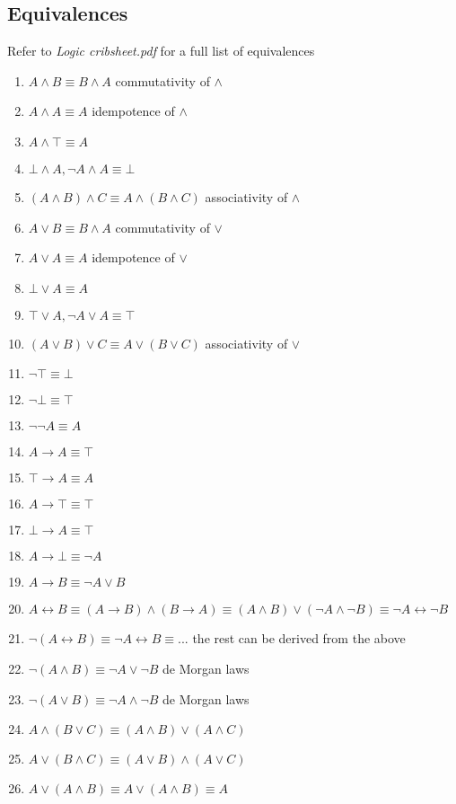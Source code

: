 \documentclass[a4paper, 12pt]{article}
\begin{document}
        \subsection*{Equivalences}
        Refer to \textit{Logic cribsheet.pdf} for a full list of equivalences
        \begin{enumerate}[1.]
            \item $A \land B \equiv B \land A$ \hfill commutativity of $\land$
            \item $A \land A \equiv A$ \hfill idempotence of $\land$
            \item $A \land \top \equiv A$
            \item $\bot \land A, \neg A \land A \equiv \bot$
            \item $(A \land B) \land C \equiv A \land (B \land C)$ \hfill associativity of $\land$
            \item $A \lor B \equiv B \land A$ \hfill commutativity of $\lor$
            \item $A \lor A \equiv A$ \hfill idempotence of $\lor$
            \item $\bot \lor A \equiv A$
            \item $\top \lor A, \neg A \lor A \equiv \top$
            \item $(A \lor B) \lor C \equiv A \lor (B \lor C)$ \hfill associativity of $\lor$
            \item $\neg \top \equiv \bot$
            \item $\neg \bot \equiv \top$
            \item $\neg \neg A \equiv A$
            \item $A \rightarrow A \equiv \top$
            \item $\top \rightarrow A \equiv A$
            \item $A \rightarrow \top \equiv \top$
            \item $\bot \rightarrow A \equiv \top$
            \item $A \rightarrow \bot \equiv \neg A$
            \item $A \rightarrow B \equiv \neg A \lor B$
            \item $A \leftrightarrow B \equiv (A \rightarrow B) \land (B \rightarrow A) \equiv (A \land B) \lor (\neg A \land \neg B) \equiv \neg A \leftrightarrow \neg B$
            \item $\neg (A \leftrightarrow B) \equiv \neg A \leftrightarrow B \equiv ...$ \hfill the rest can be derived from the above
            \item $\neg (A \land B) \equiv \neg A \lor \neg B$ \hfill de Morgan laws
            \item $\neg (A \lor B) \equiv \neg A \land \neg B$ \hfill de Morgan laws
            \item $A \land (B \lor C) \equiv (A \land B) \lor (A \land C)$
            \item $A \lor (B \land C) \equiv (A \lor B) \land (A \lor C)$
            \item $A \lor (A \land B) \equiv A \lor (A \land B) \equiv A$
        \end{enumerate}
\end{document}
